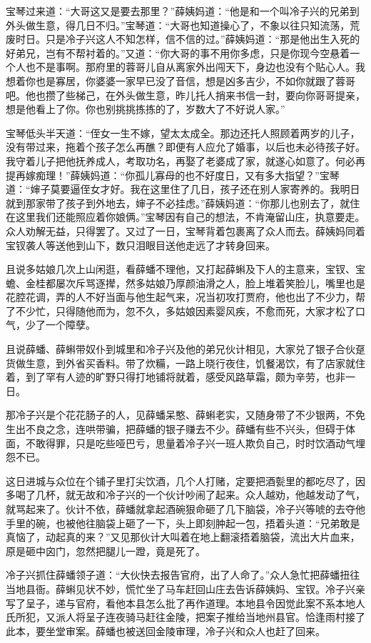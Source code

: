 \documentclass[12pt,oneside]{book}
\begin{document}
宝琴过来道：“大哥这又是要去那里？”薛姨妈道：“他是和一个叫冷子兴的兄弟到外头做生意，得几日不归。”宝琴道：“大哥也知道操心了，不象以往只知流荡，荒废时日。只是冷子兴这人不知怎样，信不信的过。”薛姨妈道：“那是他出生入死的好弟兄，岂有不帮衬着的。”又道：“你大哥的事不用你多虑，只是你现今空悬着一个人也不是事啊。那府里的蓉哥儿自从离家外出闯天下，身边也没有个贴心人。我想着你也是寡居，你婆婆一家早已没了音信，想是凶多吉少，不如你就跟了蓉哥吧。他也攒了些梯己，在外头做生意，昨儿托人捎来书信一封，要向你哥哥提亲，想是他看上了你。你也别挑挑拣拣的了，岁数大了不好说人家。”

宝琴低头半天道：“侄女一生不嫁，望太太成全。那边还托人照顾着两岁的儿子，没有带过来，拖着个孩子怎么再醮？即便有人应允了婚事，以后也未必待孩子好。我守着儿子把他抚养成人，考取功名，再娶了老婆成了家，就遂心如意了。何必再提再嫁痴理！”薛姨妈道：“你孤儿寡母的也不好度日，又有多大指望？”宝琴道：“婶子莫要逼侄女才好。我在这里住了几日，孩子还在别人家寄养的。我明日就到那家带了孩子到外地去，婶子不必挂虑。”薛姨妈道：“你那儿也别去了，就住在这里我们还能照应着你娘俩。”宝琴因有自己的想法，不肯淹留山庄，执意要走。众人劝解无益，只得罢了。又过了一日，宝琴背着包裹离了众人而去。薛姨妈同着宝钗袭人等送他到山下，数只泪眼目送他走远了才转身回来。

且说多姑娘几次上山闲逛，看薛蟠不理他，又打起薛蝌及下人的主意来，宝钗、宝蟾、金桂都屡次斥骂逐撵，然多姑娘乃厚颜油滑之人，脸上堆着笑脸儿，嘴里也是花腔花调，弄的人不好当面与他生起气来，况当初攻打贾府，他也出了不少力，帮了不少忙，只得随他而为，忽不久，多姑娘因素婴风疾，不愈而死，大家才松了口气，少了一个障孽。

且说薛蟠、薛蝌带奴仆到城里和冷子兴及他的弟兄伙计相见，大家兑了银子合伙趸货做生意，到外省买香料。带了炊糒，一路上晓行夜住，饥餐渴饮，有了店家就住着，到了罕有人迹的旷野只得打地铺将就着，感受风路草霜，颇为辛劳，也非一日。

那冷子兴是个花花肠子的人，见薛蟠呆憨、薛蝌老实，又随身带了不少银两，不免生出不良之念，连哄带骗，把薛蟠的银子赚去不少。薛蟠有些不兴头，但碍于体面，不敢得罪，只是吃些哑巴亏，思量着冷子兴一班人欺负自己，时时饮酒动气埋怨不已。

这日进城与众位在个铺子里打尖饮酒，几个人打赌，定要把酒甏里的都吃尽了，因多喝了几杯，就无故和冷子兴的一个伙计吵闹了起来。众人越劝，他越发动了气，就骂起来了。伙计不依，薛蟠就拿起酒碗狠命砸了几下脑袋，冷子兴等唬的去夺他手里的碗，也被他往脑袋上砸了一下，头上即刻肿起一包，捂着头道：“兄弟敢是真恼了，动起真的来？”又见那伙计大叫着在地上翻滚捂着脑袋，流出大片血来，原是砸中囟门，忽然把腿儿一蹬，竟是死了。

冷子兴抓住薛蟠领子道：“大伙快去报告官府，出了人命了。”众人急忙把薛蟠扭往当地县衙。薛蝌见状不妙，慌忙坐了马车赶回山庄去告诉薛姨妈、宝钗。冷子兴亲写了呈子，递与官府，看他本县怎么批了再作道理。本地县令因觉此案不系本地人氏所犯，又派人将呈子连夜骑马赶往金陵，把案子推给当地州县官。恰逢雨村接了此本，要坐堂审案。薛蟠也被送回金陵审理，冷子兴和众人也赶了回来。
\end{document}
